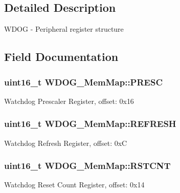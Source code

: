 \subsection{Detailed Description}
W\+D\+O\+G -\/ Peripheral register structure 

\subsection{Field Documentation}
\hypertarget{struct_w_d_o_g___mem_map_a8d00541f19094160ea06d8c7ded60298}{}
\subsubsection[{P\+R\+E\+S\+C}]{\setlength{\rightskip}{0pt plus 5cm}uint16\+\_\+t W\+D\+O\+G\+\_\+\+Mem\+Map\+::\+P\+R\+E\+S\+C}\label{struct_w_d_o_g___mem_map_a8d00541f19094160ea06d8c7ded60298}
Watchdog Prescaler Register, offset\+: 0x16 \hypertarget{struct_w_d_o_g___mem_map_a5dbb3963b38571b0de1d2db7bd89d46a}{}
\subsubsection[{R\+E\+F\+R\+E\+S\+H}]{\setlength{\rightskip}{0pt plus 5cm}uint16\+\_\+t W\+D\+O\+G\+\_\+\+Mem\+Map\+::\+R\+E\+F\+R\+E\+S\+H}\label{struct_w_d_o_g___mem_map_a5dbb3963b38571b0de1d2db7bd89d46a}
Watchdog Refresh Register, offset\+: 0x\+C \hypertarget{struct_w_d_o_g___mem_map_aad95a949933f4c578786a38a2ffeec4a}{}
\subsubsection[{R\+S\+T\+C\+N\+T}]{\setlength{\rightskip}{0pt plus 5cm}uint16\+\_\+t W\+D\+O\+G\+\_\+\+Mem\+Map\+::\+R\+S\+T\+C\+N\+T}\label{struct_w_d_o_g___mem_map_aad95a949933f4c578786a38a2ffeec4a}
Watchdog Reset Count Register, offset\+: 0x14 \hypertarget{struct_w_d_o_g___mem_map_ae48286fe7c8ceabfd9aa616e40b52a35}{}
